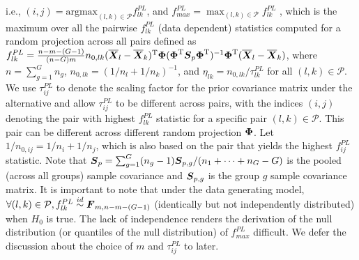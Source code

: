 \documentclass[times,sort&compress,3p]{elsarticle}
\theoremstyle{plain}%
\theoremstyle{definition}
\def\trans{^{\rm T}}
\newcommand{\uF}       {\mbox{\boldmath$F$}}
\newcommand{\uS}       {\mbox{\boldmath$S$}}
\newcommand{\uX}       {\mbox{\boldmath$X$}}
\newcommand{\uPhi}              {\mbox{\boldmath$\Phi$}}
\begin{document}
i.e., 
$(i, j) = {\mathrm{argmax}}_{(l, k)\in\mathcal{P}}f_{lk}^{PL}$, and
$f^{PL}_{max} = \max_{(l, k)\in\mathcal{P}} f^{PL}_{lk}$
, which is the maximum over all the pairwise $f^{PL}_{lk}$ (data dependent) statistics computed for a random projection across all pairs defined as 
$f^{PL}_{lk} = \frac{n-m-(G-1)}{(n-G)m} n_{0,lk} (\overline{\uX}_l - \overline{\uX}_k)\trans\uPhi(\uPhi\trans\uS_{p}\uPhi\trans)^{-1}\uPhi\trans(\overline{\uX}_l - \overline{\uX}_k)$, where $n = \sum^{G}_{g=1}n_g$, $n_{0,lk} = (1/n_l + 1/n_k)^{-1}$, and $\eta_{lk} = n_{0,lk}/\tau^{PL}_{lk}$ for all $(l, k)\in\mathcal{P}$.
 We use $\tau^{PL}_{ij}$ to denote the scaling factor for the prior covariance matrix under the alternative and allow $\tau^{PL}_{ij}$ to be different across pairs, with the indices $(i,j)$ denoting the pair with highest $f^{PL}_{lk}$ statistic for a specific pair
 $(l, k)\in\mathcal{P}$.
 This pair can be different across different random projection $\uPhi$. Let %
 $1/n_{0,ij} = 1/n_i + 1/n_j$, which is also based on the pair that yields the highest $f^{PL}_{ij}$ statistic. Note that $\uS_p = \sum^{G}_{g=1} (n_g - 1)\uS_{p,g}/(n_1+\cdots +n_{G} - G)$ is the pooled (across all groups) sample covariance and $\uS_{p,g}$ is the group $g$ sample covariance matrix. It is important to note that under the data generating model, $\forall(l,k) \in \mathcal{P}, f^{PL}_{lk} \stackrel{id}{\sim} \uF_{m, n - m- (G-1)}$ (identically but not independently distributed) when $H_{0}$ is true. The lack of independence renders the derivation of the null distribution (or quantiles of the null distribution) of $f^{PL}_{max}$ difficult. We defer the discussion about the choice of $m$ and $\tau^{PL}_{ij}$ to later. %
\end{document}
